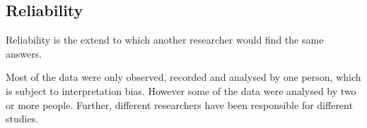 \subsection{Reliability}\label{reliability}

Reliability is the extend to which another researcher would find the same answers.

Most of the data were only observed, recorded and analysed by one person, which is subject to interpretation bias. However some of the data were analysed by two or more people. Further, different researchers have been responsible for different studies. 
